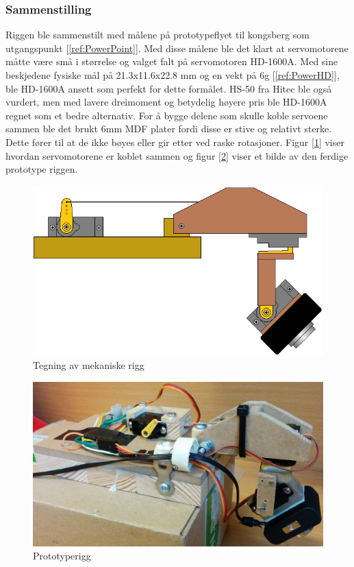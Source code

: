 \subsubsection{Sammenstilling}
Riggen ble sammenstilt med målene på prototypeflyet til kongsberg som utgangspunkt [\ref{ref:PowerPoint}]. Med disse målene ble det klart at servomotorene måtte være små i størrelse og valget falt på servomotoren HD-1600A. Med sine beskjedene fysiske mål på 21.3x11.6x22.8 mm og en vekt på 6g [\ref{ref:PowerHD}], ble HD-1600A ansett som perfekt for dette formålet. HS-50 fra Hitec ble også vurdert, men med lavere dreimoment og betydelig høyere pris ble HD-1600A regnet som et bedre alternativ. For å bygge delene som skulle koble servoene sammen ble det brukt 6mm MDF plater fordi disse er stive og relativt sterke. Dette fører til at de ikke bøyes eller gir etter ved raske rotasjoner. Figur [\ref{fig:RiggTegn}] viser hvordan servomotorene er koblet sammen og figur [\ref{fig:RiggBilde}] viser et bilde av den ferdige prototype riggen. 

\begin{figure}[h!]
	\centering
	\includegraphics[scale=0.5]{img/RIGG_sattsammen.png}
	\caption{Tegning av mekaniske rigg}
	\label{fig:RiggTegn}
\end{figure}

\begin{figure}[h!]
	\centering
	\includegraphics[scale=0.25]{img/Rigg_Bilde.jpg}
	\caption{Prototyperigg}
	\label{fig:RiggBilde}
\end{figure}


